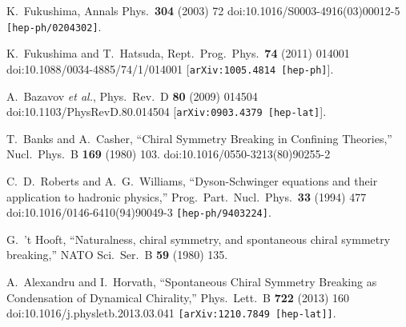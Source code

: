 \documentclass[a4paper,11pt,british,twosides]{book}%
\numberwithin{equation}{section}
\begin{document}
\begin{thebibliography}{9}
  K.~Fukushima,
  Annals Phys.\  {\bf 304} (2003) 72
  doi:10.1016/S0003-4916(03)00012-5
  {\tt[hep-ph/0204302]}.

  K.~Fukushima and T.~Hatsuda,
  Rept.\ Prog.\ Phys.\  {\bf 74} (2011) 014001
  doi:10.1088/0034-4885/74/1/014001
  [{\tt arXiv:1005.4814 [hep-ph]}].

  A.~Bazavov {\it et al.},
  Phys.\ Rev.\ D {\bf 80} (2009) 014504
  doi:10.1103/PhysRevD.80.014504
  [{\tt arXiv:0903.4379 [hep-lat]}].

  T.~Banks and A.~Casher,
  ``Chiral Symmetry Breaking in Confining Theories,''
  Nucl.\ Phys.\ B {\bf 169} (1980) 103.
  doi:10.1016/0550-3213(80)90255-2

  C.~D.~Roberts and A.~G.~Williams,
  ``Dyson-Schwinger equations and their application to hadronic physics,''
  Prog.\ Part.\ Nucl.\ Phys.\  {\bf 33} (1994) 477
  doi:10.1016/0146-6410(94)90049-3
  {\tt [hep-ph/9403224]}.

  G.~'t Hooft,
  ``Naturalness, chiral symmetry, and spontaneous chiral symmetry breaking,''
  NATO Sci.\ Ser.\ B {\bf 59} (1980) 135.

  A.~Alexandru and I.~Horvath,
  ``Spontaneous Chiral Symmetry Breaking as Condensation of Dynamical Chirality,''
  Phys.\ Lett.\ B {\bf 722} (2013) 160
  doi:10.1016/j.physletb.2013.03.041
  {\tt [arXiv:1210.7849 [hep-lat]]}.


\end{thebibliography}
\end{document}
